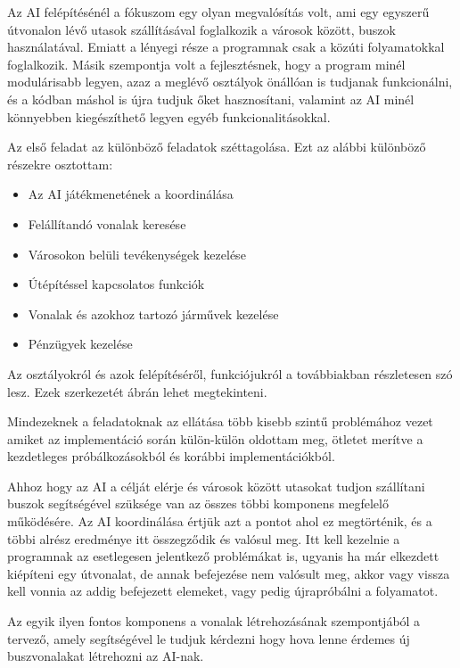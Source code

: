 
Az AI felépítésénél a fókuszom egy olyan megvalósítás volt, ami egy egyszerű útvonalon lévő utasok szállításával foglalkozik a városok között, buszok használatával. Emiatt a lényegi része a programnak csak a közúti folyamatokkal foglalkozik. Másik szempontja volt a fejlesztésnek, hogy a program minél modulárisabb legyen, azaz a meglévő osztályok önállóan is tudjanak funkcionálni, és a kódban máshol is újra tudjuk őket hasznosítani, valamint az AI minél könnyebben kiegészíthető legyen egyéb funkcionalitásokkal.


Az első feladat az különböző feladatok széttagolása. Ezt az alábbi különböző részekre osztottam:

\begin{itemize}
	\item Az AI játékmenetének a koordinálása
	\item Felállítandó vonalak keresése
	\item Városokon belüli tevékenységek kezelése
	\item Útépítéssel kapcsolatos funkciók
	\item Vonalak és azokhoz tartozó járművek kezelése
	\item Pénzügyek kezelése
\end{itemize}

Az osztályokról és azok felépítéséről, funkciójukról a továbbiakban részletesen szó lesz. Ezek szerkezetét  ábrán lehet megtekinteni.

Mindezeknek a feladatoknak az ellátása több kisebb szintű problémához vezet amiket az implementáció során külön-külön oldottam meg, ötletet merítve a kezdetleges próbálkozásokból és korábbi implementációkból.

Ahhoz hogy az AI a célját elérje és városok között utasokat tudjon szállítani buszok segítségével szüksége van az összes többi komponens megfelelő működésére. Az AI koordinálása értjük azt a pontot ahol ez megtörténik, és a többi alrész eredménye itt összegződik és valósul meg. Itt kell kezelnie a programnak az esetlegesen jelentkező problémákat is, ugyanis ha már elkezdett kiépíteni egy útvonalat, de annak befejezése nem valósult meg, akkor vagy vissza kell vonnia az addig befejezett elemeket, vagy pedig újrapróbálni a folyamatot.

Az egyik ilyen fontos komponens a vonalak létrehozásának szempontjából a tervező, amely segítségével le tudjuk kérdezni hogy hova lenne érdemes új buszvonalakat létrehozni az AI-nak.

